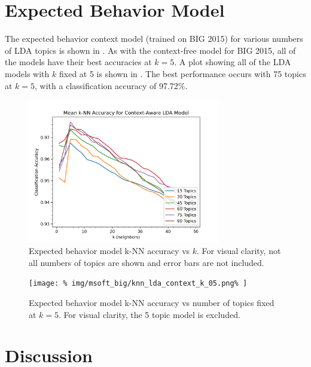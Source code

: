 \documentclass[../stegner_thesis.tex]{subfiles}
\begin{document}
\section{Expected Behavior Model}%
\label{sec:res_expected_behavior}

\par The expected behavior context model (trained on BIG 2015) for various
numbers of LDA topics is shown in .
As with the context-free model for BIG 2015, all of the models have their best
accuracies at $k=5$.
A plot showing all of the LDA models with $k$ fixed at 5 is shown in
.
The best performance occurs with 75 topics at $k=5$, with a classification
accuracy of 97.72\%.

\begin{figure}[p]
	\centering
	\includegraphics[width=0.75\textwidth]{img/msoft_big/knn_lda_context.png}
	\caption[Expected behavior model k-NN accuracy vs $k$]{%
		Expected behavior model k-NN accuracy vs $k$.
		For visual clarity, not all numbers of topics are shown and error bars are
		not included.
	}%
	\label{fig:expected_behavior_topic}
\end{figure}
\begin{figure}[p]
	\centering
	\texttt{[image: \%
		img/msoft\_big/knn\_lda\_context\_k\_05.png\%
	]}
	\caption[Expected behavior model k-NN accuracy vs number of topics]{%
		Expected behavior model k-NN accuracy vs number of topics fixed at $k=5$.
		For visual clarity, the 5 topic model is excluded.
	}%
	\label{fig:expected_behavior_k5}
\end{figure}

\section{Discussion}%
\label{sec:res_discussion}
\end{document}
